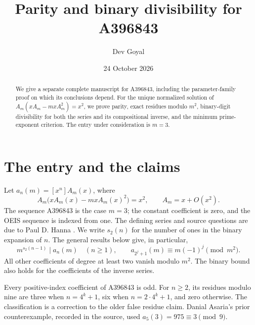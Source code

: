 \documentclass[11pt,a4paper]{article}
\title{Parity and binary divisibility for A396843}
\author{Dev Goyal}
\date{24 October 2026}
\theoremstyle{remark}\newtheorem{remark}[theorem]{Remark}
\begin{document}
\maketitle
\begin{center}\end{center}

\begin{abstract}
We give a separate complete manuscript for A396843, including the
parameter-family proof on which its conclusions depend. For the unique
normalized solution of $A_m(xA_m-mxA_m^2)=x^2$, we prove parity,
exact residues modulo $m^2$, binary-digit divisibility for both the series
and its compositional inverse, and the minimum prime-exponent criterion.
The entry under consideration is $m=3$.
\end{abstract}
\section{The entry and the claims}
Let $a_n(m)=[x^n]A_m(x)$, where
\begin{equation}\label{eq:general}
 A_m\bigl(xA_m(x)-mxA_m(x)^2\bigr)=x^2,
 \qquad A_m=x+O(x^2).
\end{equation}
The sequence A396843 is the case $m=3$; the constant
coefficient is zero, and the OEIS sequence is indexed from one.
The defining series and source questions are due to Paul D. Hanna
\cite{oeis3}.
We write $s_2(n)$ for the number of ones in the binary expansion of $n$.
The general results below give, in particular,
\[
 m^{s_2(n-1)}\mid a_n(m)\quad(n\ge1),
 \qquad
 a_{2^j+1}(m)\equiv m(-1)^j\pmod{m^2}.
\]
All other coefficients of degree at least two vanish modulo $m^2$.
The binary bound also holds for the coefficients of the inverse series.

Every positive-index coefficient of A396843 is odd. For $n\ge2$,
its residues modulo nine are three when $n=4^k+1$, six when
$n=2\cdot4^k+1$, and zero otherwise. The classification is a correction
to the older false residue claim. Danial Asaria's prior counterexample,
recorded in the source, used $a_5(3)=975\equiv3\pmod9$.
\end{document}
